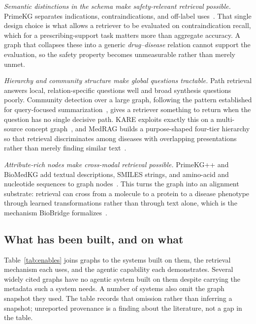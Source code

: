 \emph{Semantic distinctions in the schema make safety-relevant retrieval possible.} PrimeKG separates indications, contraindications, and off-label uses~\cite{chandak2023primekg}. That single design choice is what allows a retriever to be evaluated on contraindication recall, which for a prescribing-support task matters more than aggregate accuracy. A graph that collapses these into a generic \emph{drug--disease} relation cannot support the evaluation, so the safety property becomes unmeasurable rather than merely unmet.

\emph{Hierarchy and community structure make global questions tractable.} Path retrieval answers local, relation-specific questions well and broad synthesis questions poorly. Community detection over a large graph, following the pattern established for query-focused summarization~\cite{edge2024graphrag}, gives a retriever something to return when the question has no single decisive path. KARE exploits exactly this on a multi-source concept graph~\cite{jiang2025kare}, and MedRAG builds a purpose-shaped four-tier hierarchy so that retrieval discriminates among diseases with overlapping presentations rather than merely finding similar text~\cite{zhao2025medrag}.

\emph{Attribute-rich nodes make cross-modal retrieval possible.} PrimeKG++ and BioMedKG add textual descriptions, SMILES strings, and amino-acid and nucleotide sequences to graph nodes~\cite{dang2025biomedkg}. This turns the graph into an alignment substrate: retrieval can cross from a molecule to a protein to a disease phenotype through learned transformations rather than through text alone, which is the mechanism BioBridge formalizes~\cite{wang2024biobridge}.

\subsection{What has been built, and on what}

Table~\ref{tab:enables} joins graphs to the systems built on them, the retrieval mechanism each uses, and the agentic capability each demonstrates. Several widely cited graphs have no agentic system built on them despite carrying the metadata such a system needs. A number of systems also omit the graph snapshot they used. The table records that omission rather than inferring a snapshot; unreported provenance is a finding about the literature, not a gap in the table.


